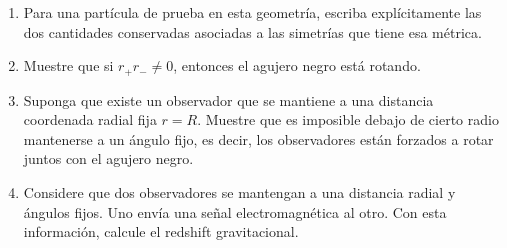 \documentclass[../main]{subfiles}
\begin{document}
\begin{enumerate}
\begin{enumerate}[label=(\alph*)]
\begin{equation}
        \end{equation}
        \begin{enumerate}[label=(\alph*)]
            \item Para una partícula de prueba en esta geometría, escriba explícitamente las dos cantidades conservadas asociadas a las simetrías que tiene esa métrica.
            \item Muestre que si $r_+ r_- \neq 0$, entonces el agujero negro está rotando.
            \item Suponga que existe un observador que se mantiene a una distancia coordenada radial fija $r=R$. Muestre que es imposible debajo de cierto radio mantenerse a un ángulo fijo, es decir, los observadores están forzados a rotar juntos con el agujero negro. 
            \item Considere que dos observadores se mantengan a una distancia radial y ángulos fijos. Uno envía una señal electromagnética al otro. Con esta información, calcule el redshift gravitacional.
        \end{enumerate}
    \end{enumerate}
\end{enumerate}
\end{document}
